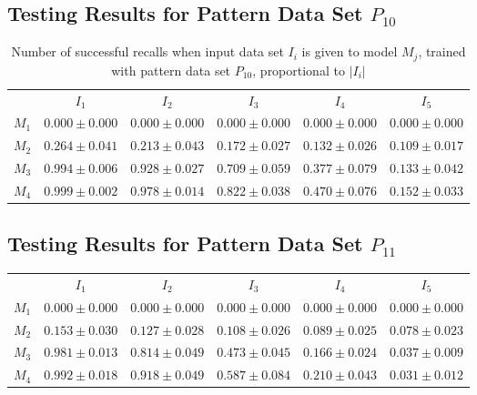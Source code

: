 \documentclass[12pt]{article}
\begin{document}
\begin{appendices}
\subsection{Testing Results for Pattern Data Set $P_{10}$}


    \begin{table}[H]
    \centering
    \def\arraystretch{1.5}
    \footnotesize
    \begin{tabular}{cccccc}
    
 & $I_{1}$  & $I_{2}$  & $I_{3}$  & $I_{4}$  & $I_{5}$ \\ \cline{2-6}
$M_{1}$  & $0.000\pm0.000$  & $0.000\pm0.000$  & $0.000\pm0.000$  & $0.000\pm0.000$  & $0.000\pm0.000$ \\
$M_{2}$  & $0.264\pm0.041$  & $0.213\pm0.043$  & $0.172\pm0.027$  & $0.132\pm0.026$  & $0.109\pm0.017$ \\
$M_{3}$  & $0.994\pm0.006$  & $0.928\pm0.027$  & $0.709\pm0.059$  & $0.377\pm0.079$  & $0.133\pm0.042$ \\
$M_{4}$  & $0.999\pm0.002$  & $0.978\pm0.014$  & $0.822\pm0.038$  & $0.470\pm0.076$  & $0.152\pm0.033$ \\

    \end{tabular}
    \caption{Number of successful recalls when input data set $I_i$ is given to model $M_j$, trained with pattern data set $P_{10}$, proportional to $\left|I_i\right|$}
    \end{table}
    
\subsection{Testing Results for Pattern Data Set $P_{11}$}


    \begin{table}[H]
    \centering
    \def\arraystretch{1.5}
    \footnotesize
    \begin{tabular}{cccccc}
    
 & $I_{1}$  & $I_{2}$  & $I_{3}$  & $I_{4}$  & $I_{5}$ \\ \cline{2-6}
$M_{1}$  & $0.000\pm0.000$  & $0.000\pm0.000$  & $0.000\pm0.000$  & $0.000\pm0.000$  & $0.000\pm0.000$ \\
$M_{2}$  & $0.153\pm0.030$  & $0.127\pm0.028$  & $0.108\pm0.026$  & $0.089\pm0.025$  & $0.078\pm0.023$ \\
$M_{3}$  & $0.981\pm0.013$  & $0.814\pm0.049$  & $0.473\pm0.045$  & $0.166\pm0.024$  & $0.037\pm0.009$ \\
$M_{4}$  & $0.992\pm0.018$  & $0.918\pm0.049$  & $0.587\pm0.084$  & $0.210\pm0.043$  & $0.031\pm0.012$ \\


\end{tabular}
\end{table}
\end{appendices}
\end{document}
